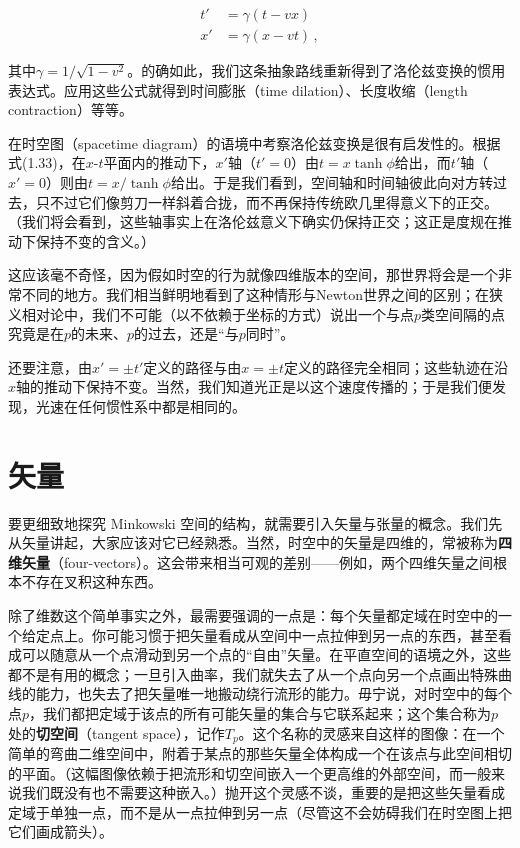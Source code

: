 \begin{align*}
t'&=\gamma(t-vx)\\
x'&=\gamma(x-vt)\,,
\tag{1.35}
\end{align*}

其中$\gamma=1/\sqrt{1-v^{2}}$。的确如此，我们这条抽象路线重新得到了洛伦兹变换的惯用表达式。应用这些公式就得到时间膨胀（time dilation）、长度收缩（length contraction）等等。

在时空图（spacetime diagram）的语境中考察洛伦兹变换是很有启发性的。根据式(1.33)，在$x$-$t$平面内的推动下，$x'$轴（$t'=0$）由$t=x\tanh\phi$给出，而$t'$轴（$x'=0$）则由$t=x/\tanh\phi$给出。于是我们看到，空间轴和时间轴彼此向对方转过去，只不过它们像剪刀一样斜着合拢，而不再保持传统欧几里得意义下的正交。（我们将会看到，这些轴事实上在洛伦兹意义下确实仍保持正交；这正是度规在推动下保持不变的含义。）


这应该毫不奇怪，因为假如时空的行为就像四维版本的空间，那世界将会是一个非常不同的地方。我们相当鲜明地看到了这种情形与Newton世界之间的区别；在狭义相对论中，我们不可能（以不依赖于坐标的方式）说出一个与点$p$类空间隔的点究竟是在$p$的未来、$p$的过去，还是“与$p$同时”。

还要注意，由$x'=\pm t'$定义的路径与由$x=\pm t$定义的路径完全相同；这些轨迹在沿$x$轴的推动下保持不变。当然，我们知道光正是以这个速度传播的；于是我们便发现，光速在任何惯性系中都是相同的。

\section{矢量}

要更细致地探究 Minkowski 空间的结构，就需要引入矢量与张量的概念。我们先从矢量讲起，大家应该对它已经熟悉。当然，时空中的矢量是四维的，常被称为\textbf{四维矢量}（four-vectors）。这会带来相当可观的差别——例如，两个四维矢量之间根本不存在叉积这种东西。

除了维数这个简单事实之外，最需要强调的一点是：每个矢量都定域在时空中的一个给定点上。你可能习惯于把矢量看成从空间中一点拉伸到另一点的东西，甚至看成可以随意从一个点滑动到另一个点的“自由”矢量。在平直空间的语境之外，这些都不是有用的概念；一旦引入曲率，我们就失去了从一个点向另一个点画出特殊曲线的能力，也失去了把矢量唯一地搬动绕行流形的能力。毋宁说，对时空中的每个点$p$，我们都把定域于该点的所有可能矢量的集合与它联系起来；这个集合称为$p$处的\textbf{切空间}（tangent space），记作$T_p$。这个名称的灵感来自这样的图像：在一个简单的弯曲二维空间中，附着于某点的那些矢量全体构成一个在该点与此空间相切的平面。（这幅图像依赖于把流形和切空间嵌入一个更高维的外部空间，而一般来说我们既没有也不需要这种嵌入。）抛开这个灵感不谈，重要的是把这些矢量看成定域于单独一点，而不是从一点拉伸到另一点（尽管这不会妨碍我们在时空图上把它们画成箭头）。

